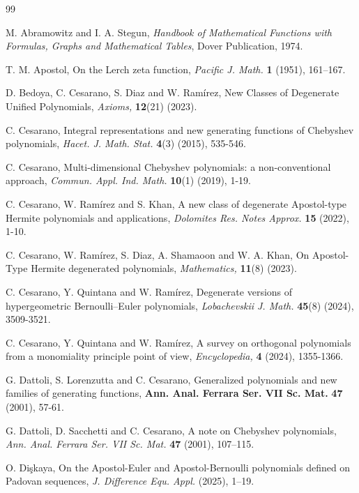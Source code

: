 \documentclass[12pt, a4paper]{article}
\theoremstyle{definition}
\numberwithin{equation}{section}
\begin{document}
\begin{thebibliography}{99}

M. Abramowitz and I. A. Stegun, \textit{Handbook of Mathematical Functions with Formulas, Graphs and Mathematical Tables}, Dover Publication, 1974.

T. M. Apostol, On the Lerch zeta function, \textit{Pacific J. Math.} \textbf{1} (1951), 161–167.

D. Bedoya, C. Cesarano, S. Diaz and W. Ram\'irez, New Classes of Degenerate Unified Polynomials, \textit{Axioms,} \textbf{12}(21) (2023).

C. Cesarano, Integral representations and new generating functions of Chebyshev polynomials, \textit{Hacet. J. Math. Stat.} \textbf{4}(3) (2015), 535-546.

C. Cesarano, Multi-dimensional Chebyshev polynomials: a non-conventional approach, \textit{Commun. Appl. Ind. Math.} \textbf{10}(1) (2019), 1-19.


C. Cesarano, W. Ram\'irez and S. Khan,  A new class of degenerate Apostol-type Hermite polynomials and applications, \textit{Dolomites Res. Notes Approx.} \textbf{15} (2022), 1-10.

C. Cesarano, W. Ram\'irez, S. Diaz, A. Shamaoon and W. A. Khan, On Apostol-Type Hermite degenerated polynomials, \textit{Mathematics,} \textbf{11}(8) (2023).

C. Cesarano, Y. Quintana and W. Ram\'irez, Degenerate versions of hypergeometric Bernoulli–Euler polynomials, \textit{Lobachevskii J. Math.} \textbf{45}(8) (2024), 3509-3521.

C. Cesarano, Y. Quintana and W. Ram\'irez, A survey on orthogonal polynomials from a monomiality principle point of view, \textit{Encyclopedia,} \textbf{4} (2024), 1355-1366.

G. Dattoli, S. Lorenzutta and C. Cesarano, Generalized polynomials and new families of generating functions, \textbf{Ann. Anal. Ferrara Ser. VII Sc. Mat.} \textbf{47} (2001), 57-61.


G. Dattoli, D. Sacchetti and  C. Cesarano, A note on Chebyshev polynomials, \textit{Ann. Anal. Ferrara Ser. VII Sc. Mat.} \textbf{47} (2001), 107–115.



O. Di\c{s}kaya, On the Apostol-Euler and Apostol-Bernoulli polynomials defined on Padovan sequences, \textit{J. Difference Equ. Appl.} (2025), 1–19.


\end{thebibliography}
\end{document}
